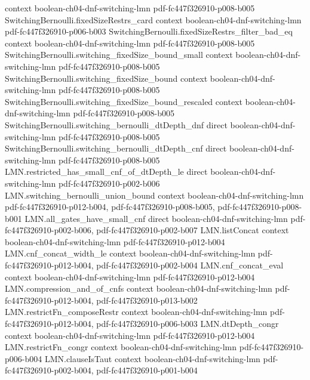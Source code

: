 \begin{theorem}
  {context}
  {boolean-ch04-dnf-switching-lmn}
  {pdf-fc447f326910-p008-b005}
\proofstep
  {SwitchingBernoulli.fixedSizeRestrs_card}
  {context}
  {boolean-ch04-dnf-switching-lmn}
  {pdf-fc447f326910-p006-b003}
\proofstep
  {SwitchingBernoulli.fixedSizeRestrs_filter_bad_eq}
  {context}
  {boolean-ch04-dnf-switching-lmn}
  {pdf-fc447f326910-p008-b005}
\proofstep
  {SwitchingBernoulli.switching_fixedSize_bound_small}
  {context}
  {boolean-ch04-dnf-switching-lmn}
  {pdf-fc447f326910-p008-b005}
\proofstep
  {SwitchingBernoulli.switching_fixedSize_bound}
  {context}
  {boolean-ch04-dnf-switching-lmn}
  {pdf-fc447f326910-p008-b005}
\proofstep
  {SwitchingBernoulli.switching_fixedSize_bound_rescaled}
  {context}
  {boolean-ch04-dnf-switching-lmn}
  {pdf-fc447f326910-p008-b005}
\proofstep
  {SwitchingBernoulli.switching_bernoulli_dtDepth_dnf}
  {direct}
  {boolean-ch04-dnf-switching-lmn}
  {pdf-fc447f326910-p008-b005}
\proofstep
  {SwitchingBernoulli.switching_bernoulli_dtDepth_cnf}
  {direct}
  {boolean-ch04-dnf-switching-lmn}
  {pdf-fc447f326910-p008-b005}
\proofstep
  {LMN.restricted_has_small_cnf_of_dtDepth_le}
  {direct}
  {boolean-ch04-dnf-switching-lmn}
  {pdf-fc447f326910-p002-b006}
\proofstep
  {LMN.switching_bernoulli_union_bound}
  {context}
  {boolean-ch04-dnf-switching-lmn}
  {pdf-fc447f326910-p012-b004,
    pdf-fc447f326910-p008-b005,
    pdf-fc447f326910-p008-b001}
\proofstep
  {LMN.all_gates_have_small_cnf}
  {direct}
  {boolean-ch04-dnf-switching-lmn}
  {pdf-fc447f326910-p002-b006,
    pdf-fc447f326910-p002-b007}
\proofstep
  {LMN.listConcat}
  {context}
  {boolean-ch04-dnf-switching-lmn}
  {pdf-fc447f326910-p012-b004}
\proofstep
  {LMN.cnf_concat_width_le}
  {context}
  {boolean-ch04-dnf-switching-lmn}
  {pdf-fc447f326910-p012-b004,
    pdf-fc447f326910-p002-b004}
\proofstep
  {LMN.cnf_concat_eval}
  {context}
  {boolean-ch04-dnf-switching-lmn}
  {pdf-fc447f326910-p012-b004}
\proofstep
  {LMN.compression_and_of_cnfs}
  {context}
  {boolean-ch04-dnf-switching-lmn}
  {pdf-fc447f326910-p012-b004,
    pdf-fc447f326910-p013-b002}
\proofstep
  {LMN.restrictFn_composeRestr}
  {context}
  {boolean-ch04-dnf-switching-lmn}
  {pdf-fc447f326910-p012-b004,
    pdf-fc447f326910-p006-b003}
\proofstep
  {LMN.dtDepth_congr}
  {context}
  {boolean-ch04-dnf-switching-lmn}
  {pdf-fc447f326910-p012-b004}
\proofstep
  {LMN.restrictFn_congr}
  {context}
  {boolean-ch04-dnf-switching-lmn}
  {pdf-fc447f326910-p006-b004}
\proofstep
  {LMN.clauseIsTaut}
  {context}
  {boolean-ch04-dnf-switching-lmn}
  {pdf-fc447f326910-p002-b004,
    pdf-fc447f326910-p001-b004}
\proofstep

\end{theorem}
